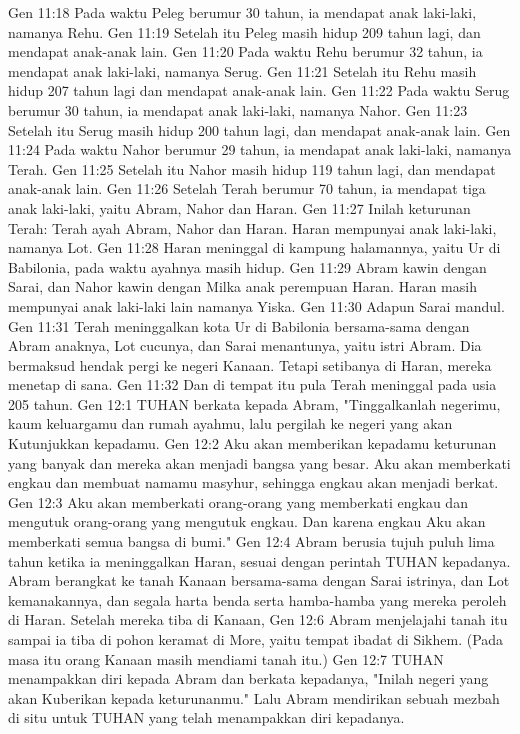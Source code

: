 Gen 11:18  Pada waktu Peleg berumur 30 tahun, ia mendapat anak laki-laki, namanya Rehu.
Gen 11:19  Setelah itu Peleg masih hidup 209 tahun lagi, dan mendapat anak-anak lain.
Gen 11:20  Pada waktu Rehu berumur 32 tahun, ia mendapat anak laki-laki, namanya Serug.
Gen 11:21  Setelah itu Rehu masih hidup 207 tahun lagi dan mendapat anak-anak lain.
Gen 11:22  Pada waktu Serug berumur 30 tahun, ia mendapat anak laki-laki, namanya Nahor.
Gen 11:23  Setelah itu Serug masih hidup 200 tahun lagi, dan mendapat anak-anak lain.
Gen 11:24  Pada waktu Nahor berumur 29 tahun, ia mendapat anak laki-laki, namanya Terah.
Gen 11:25  Setelah itu Nahor masih hidup 119 tahun lagi, dan mendapat anak-anak lain.
Gen 11:26  Setelah Terah berumur 70 tahun, ia mendapat tiga anak laki-laki, yaitu Abram, Nahor dan Haran.
Gen 11:27  Inilah keturunan Terah: Terah ayah Abram, Nahor dan Haran. Haran mempunyai anak laki-laki, namanya Lot.
Gen 11:28  Haran meninggal di kampung halamannya, yaitu Ur di Babilonia, pada waktu ayahnya masih hidup.
Gen 11:29  Abram kawin dengan Sarai, dan Nahor kawin dengan Milka anak perempuan Haran. Haran masih mempunyai anak laki-laki lain namanya Yiska.
Gen 11:30  Adapun Sarai mandul.
Gen 11:31  Terah meninggalkan kota Ur di Babilonia bersama-sama dengan Abram anaknya, Lot cucunya, dan Sarai menantunya, yaitu istri Abram. Dia bermaksud hendak pergi ke negeri Kanaan. Tetapi setibanya di Haran, mereka menetap di sana.
Gen 11:32  Dan di tempat itu pula Terah meninggal pada usia 205 tahun.
Gen 12:1  TUHAN berkata kepada Abram, "Tinggalkanlah negerimu, kaum keluargamu dan rumah ayahmu, lalu pergilah ke negeri yang akan Kutunjukkan kepadamu.
Gen 12:2  Aku akan memberikan kepadamu keturunan yang banyak dan mereka akan menjadi bangsa yang besar. Aku akan memberkati engkau dan membuat namamu masyhur, sehingga engkau akan menjadi berkat.
Gen 12:3  Aku akan memberkati orang-orang yang memberkati engkau dan mengutuk orang-orang yang mengutuk engkau. Dan karena engkau Aku akan memberkati semua bangsa di bumi."
Gen 12:4  Abram berusia tujuh puluh lima tahun ketika ia meninggalkan Haran, sesuai dengan perintah TUHAN kepadanya. Abram berangkat ke tanah Kanaan bersama-sama dengan Sarai istrinya, dan Lot kemanakannya, dan segala harta benda serta hamba-hamba yang mereka peroleh di Haran. Setelah mereka tiba di Kanaan,
Gen 12:6  Abram menjelajahi tanah itu sampai ia tiba di pohon keramat di More, yaitu tempat ibadat di Sikhem. (Pada masa itu orang Kanaan masih mendiami tanah itu.)
Gen 12:7  TUHAN menampakkan diri kepada Abram dan berkata kepadanya, "Inilah negeri yang akan Kuberikan kepada keturunanmu." Lalu Abram mendirikan sebuah mezbah di situ untuk TUHAN yang telah menampakkan diri kepadanya.
